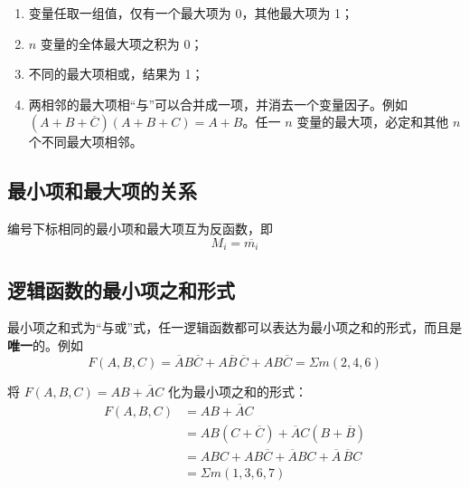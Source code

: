\begin{property}[最大项的性质]
	\begin{enumerate}
		\item 变量任取一组值，仅有一个最大项为 0，其他最大项为 1；
		\item $n$ 变量的全体最大项之积为 0；
		\item 不同的最大项相或，结果为 1；
		\item 两相邻的最大项相“与”可以合并成一项，并消去一个变量因子。例如 $(A+B+\overline{C})(A+B+C)=A+B$。任一 $n$ 变量的最大项，必定和其他 $n$ 个不同最大项相邻。
	\end{enumerate}
\end{property}

\subsection{最小项和最大项的关系}
\label{sec:最小项和最大项的关系}

\begin{theorem}[最小项与最大项的关系]
	编号下标相同的最小项和最大项互为反函数，即
	\begin{equation}
		M_i=\overline{m_i}
		\label{eq:标准形式:最小项最大项关系}
	\end{equation}
\end{theorem}

\subsection{逻辑函数的最小项之和形式}
\label{sec:逻辑函数的最小项之和形式}

\begin{theorem}[最小项之和形式]
	最小项之和式为“与或”式，任一逻辑函数都可以表达为最小项之和的形式，而且是\textbf{唯一}的。例如
	\begin{equation}
		F(A,B,C)=\overline{A}B\overline{C}+A\overline{B}\,\overline{C}+AB\overline{C}=\Sigma m(2,4,6)
		\label{eq:标准形式:最小项之和}
	\end{equation}
\end{theorem}

\begin{example}
	将 $F(A,B,C)=AB+\overline{A}C$ 化为最小项之和的形式：
	\begin{equation}
		\begin{aligned}
			F(A,B,C) &= AB+\overline{A}C \\
			&= AB(C+\overline{C})+\overline{A}C(B+\overline{B}) \\
			&= ABC+AB\overline{C}+\overline{A}BC+\overline{A}\,\overline{B}C \\
			&= \Sigma m(1,3,6,7)
		\end{aligned}
		\label{eq:标准形式:最小项之和例}
	\end{equation}
\end{example}

